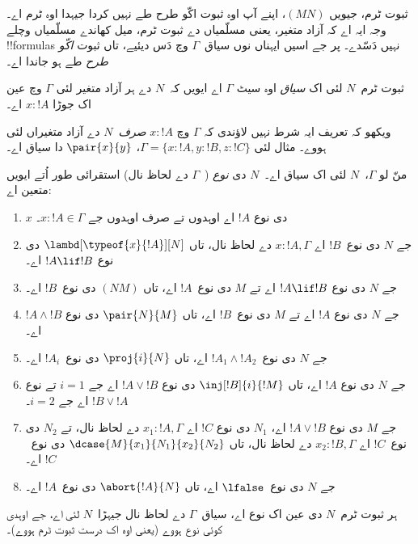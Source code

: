 \documentclass[../../../include/open-logic-section]{subfiles}
\begin{document}


ثبوت ٹرم، جیویں $(MN)$، اپنے آپ اوہ ثبوت اکّو طرح طے نہیں کردا جیہدا اوہ ٹرم اے۔ وجہ ایہ اے کہ آزاد متغیر، یعنی مسلّمیاں دے ثبوت ٹرم، میل کھاندے مسلّمیاں وچلے !!{formula}s نہیں دَسّدے۔ پر جے اسیں ایہناں نوں سیاق~$\Gamma$ وچ دَس دیئیے، تاں ثبوت \emph{اکّو طرح} طے ہو جاندا اے۔

\begin{defn}
ثبوت ٹرم~$N$ لئی اک \emph{سیاق} اوہ سیٹ $ \Gamma$ اے ایویں کہ~$N$ دے ہر آزاد متغیر لئی $\Gamma$ وچ عین اک جوڑا $x : !A$ اے۔
\end{defn}

ویکھو کہ تعریف ایہ شرط نہیں لاؤندی کہ $\Gamma$ وچ $x:!A$ \emph{صرف}~$N$ دے آزاد متغیراں لئی ہووے۔ مثال لئی $\Gamma =
\{x:!A, y:!B, z:!C\}$، $\pair{x}{y}$ دا سیاق اے۔

\begin{defn}
  منّ لو $\Gamma$،~$N$ لئی اک سیاق اے۔~$N$ دی \emph{نوع} (~$\Gamma$ دے لحاظ نال) استقرائی طور اُتے ایویں متعین اے:
  \begin{enumerate}
  \item $x$ دی نوع $!A$ اے اوہدوں تے صرف اوہدوں جے $x:!A \in \Gamma$۔
  \item جے $N$ دی نوع~$!B$ اے $x:!A, \Gamma$ دے لحاظ نال، تاں $\lambd[\typeof{x}{!A}][N]$ دی نوع $!A \lif !B$ اے۔
  \item جے $N$ دی نوع $!A \lif !B$ اے تے $M$ دی نوع~$!A$ اے، تاں $(NM)$ دی نوع~$!B$ اے۔
  \item جے $N$ دی نوع $!A$ اے تے $M$ دی نوع~$!B$ اے، تاں $\pair{N}{M}$ دی نوع $!A \land !B$ اے۔
  \item جے $N$ دی نوع~$!A_1 \land !A_2$ اے، تاں $\proj{i}{N}$ دی نوع~$!A_i$ اے۔
  \item جے $N$ دی نوع $!A$ اے، تاں $\inj[!B]{i}{!M}$ دی نوع $!A \lor !B$ اے جے $i=1$ تے نوع $!B \lor
    !A$ اے جے $i=2$۔
  \item جے $M$ دی نوع $!A \lor !B$ اے، $N_1$ دی نوع $!C$ اے $x_1:!A, \Gamma$ دے لحاظ نال، تے $N_2$ دی نوع~$!C$ اے $x_2:!B,
  \Gamma$ دے لحاظ نال، تاں $\dcase{M}{x_1}{N_1}{x_2}{N_2}$ دی نوع~$!C$ اے۔
  \item جے $N$ دی نوع~$\lfalse$ اے، تاں $\abort{!A}{N}$ دی نوع~$!A$ اے۔
  \end{enumerate}
\end{defn}

\begin{prop}
ہر ثبوت ٹرم~$N$ دی عین اک نوع اے، سیاق~$\Gamma$ دے لحاظ نال جیہڑا~$N$ لئی اے، جے اوہدی کوئی نوع ہووے (یعنی اوہ اک درست ثبوت ٹرم ہووے)۔
\end{prop}
\end{document}
